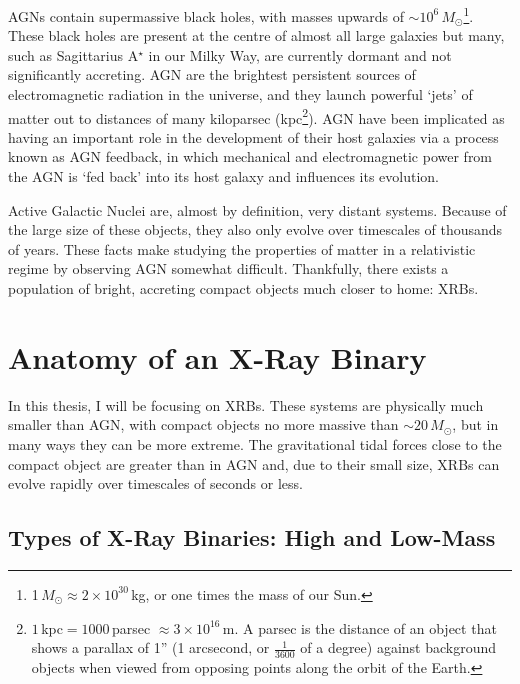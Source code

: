 \par AGNs contain supermassive black holes, with masses upwards of $\sim10^6$\,$M_\odot$\footnote{1\,$M_\odot\approx2\times10^{30}$\,kg, or one times the mass of our Sun.}.  These black holes are present at the centre of almost all large galaxies but many, such as Sagittarius A$^\star$ in our Milky Way, are currently dormant and not significantly accreting.  AGN are the brightest persistent sources of electromagnetic radiation in the universe, and they launch powerful `jets' of matter out to distances of many kiloparsec (kpc\footnote{$1$\,kpc$ =1000$\,parsec $\approx3\times10^{16}$\,m.  A parsec is the distance of an object that shows a parallax of 1'' (1 arcsecond, or $\frac{1}{3600}$ of a degree) against background objects when viewed from opposing points along the orbit of the Earth.}).  AGN have been implicated as having an important role in the development of their host galaxies via a process known as AGN feedback, in which mechanical and electromagnetic power from the AGN is `fed back' into its host galaxy and influences its evolution.
\par Active Galactic Nuclei are, almost by definition, very distant systems.  Because of the large size of these objects, they also only evolve over timescales of thousands of years.  These facts make studying the properties of matter in a relativistic regime by observing AGN somewhat difficult.  Thankfully, there exists a population of bright, accreting compact objects much closer to home: XRBs.

\section{Anatomy of an X-Ray Binary}

\par In this thesis, I will be focusing on XRBs.  These systems are physically much smaller than AGN, with compact objects no more massive than $\sim20\,M_\odot$, but in many ways they can be more extreme.  The gravitational tidal forces close to the compact object are greater than in AGN and, due to their small size, XRBs can evolve rapidly over timescales of seconds or less.

\subsection{Types of X-Ray Binaries: High and Low-Mass}

